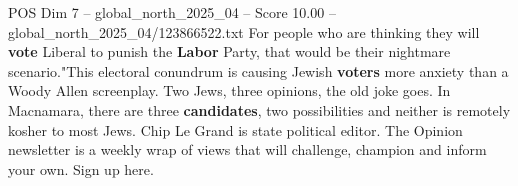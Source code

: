 \begin{textsample}{POS Dim 7 – global\_north\_2025\_04 – Score 10.00 – global\_north\_2025\_04/123866522.txt}
For people who are thinking they will \textbf{vote} Liberal to punish the \textbf{Labor} Party, that would be their nightmare scenario."This electoral conundrum is causing Jewish \textbf{voters} more anxiety than a Woody Allen screenplay.
Two Jews, three opinions, the old joke goes.
In Macnamara, there are three \textbf{candidates}, two possibilities and neither is remotely kosher to most Jews.
Chip Le Grand is state political editor.
The Opinion newsletter is a weekly wrap of views that will challenge, champion and inform your own.
Sign up here.

\end{textsample}
